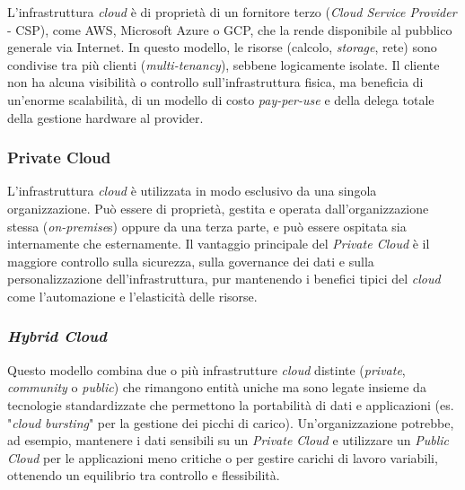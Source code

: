 L'infrastruttura \textit{cloud} è di proprietà di un fornitore terzo (\textit{Cloud Service Provider} - CSP), come AWS, Microsoft Azure o GCP, che la rende disponibile al pubblico generale via Internet. In questo modello, le risorse (calcolo, \textit{storage}, rete) sono condivise tra più clienti (\textit{multi-tenancy}), sebbene logicamente isolate. Il cliente non ha alcuna visibilità o controllo sull'infrastruttura fisica, ma beneficia di un'enorme scalabilità, di un modello di costo \textit{pay-per-use} e della delega totale della gestione hardware al provider.


\subsubsection{Private Cloud}


L'infrastruttura \textit{cloud} è utilizzata in modo esclusivo da una singola organizzazione. Può essere di proprietà, gestita e operata dall'organizzazione stessa (\textit{on-premise}s) oppure da una terza parte, e può essere ospitata sia internamente che esternamente. Il vantaggio principale del \textit{Private Cloud} è il maggiore controllo sulla sicurezza, sulla governance dei dati e sulla personalizzazione dell'infrastruttura, pur mantenendo i benefici tipici del \textit{cloud} come l'automazione e l'elasticità delle risorse.



\subsubsection{\textit{Hybrid Cloud}}
Questo modello combina due o più infrastrutture \textit{cloud} distinte (\textit{private}, \textit{community} o \textit{public}) che rimangono entità uniche ma sono legate insieme da tecnologie standardizzate che permettono la portabilità di dati e applicazioni (es. "\textit{cloud bursting}" per la gestione dei picchi di carico). Un'organizzazione potrebbe, ad esempio, mantenere i dati sensibili su un \textit{Private Cloud} e utilizzare un \textit{Public Cloud} per le applicazioni meno critiche o per gestire carichi di lavoro variabili, ottenendo un equilibrio tra controllo e flessibilità.


